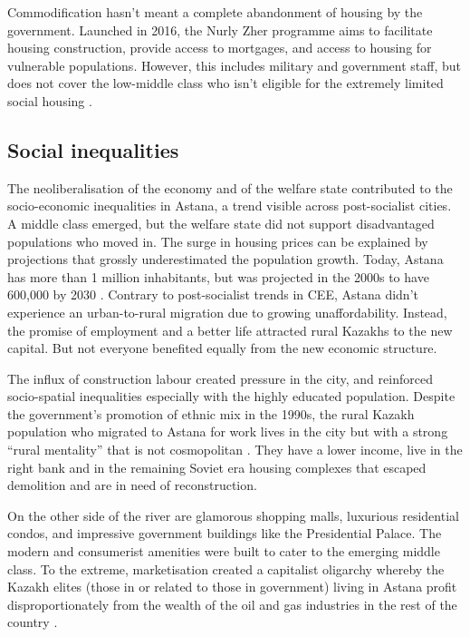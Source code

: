 \documentclass{article}
\begin{document}
Commodification hasn't meant a complete abandonment of housing by the government. Launched in 2016, the Nurly Zher programme aims to facilitate housing construction, provide access to mortgages, and access to housing for vulnerable populations. However, this includes military and government staff, but does not cover the low-middle class who isn't eligible for the extremely limited social housing \parencite{unece2018housing}.

\subsection{Social inequalities}

The neoliberalisation of the economy and of the welfare state contributed to the socio-economic inequalities in Astana, a trend visible across post-socialist cities. A middle class emerged, but the welfare state did not support disadvantaged populations who moved in. The surge in housing prices can be explained by projections that grossly underestimated the population growth. Today, Astana has more than 1 million inhabitants, but was projected in the 2000s to have 600,000 by 2030 \parencite{masterplan2001}. Contrary to post-socialist trends in CEE, Astana didn't experience an urban-to-rural migration due to growing unaffordability. Instead, the promise of employment and a better life attracted rural Kazakhs to the new capital. But not everyone benefited equally from the new economic structure.

The influx of construction labour created pressure in the city, and reinforced socio-spatial inequalities especially with the highly educated population.
Despite the government's promotion of ethnic mix in the 1990s, the rural Kazakh population who migrated to Astana for work lives in the city but with a strong ``rural mentality'' that is not cosmopolitan \parencite{koch2014bordering}. They have a lower income, live in the right bank and in the remaining Soviet era housing complexes that escaped demolition and are in need of reconstruction.

On the other side of the river are glamorous shopping malls, luxurious residential condos, and impressive government buildings like the Presidential Palace. The modern and consumerist amenities were built to cater to the emerging middle class. To the extreme, marketisation created a capitalist oligarchy whereby the Kazakh elites (those in or related to those in government) living in Astana profit disproportionately from the wealth of the oil and gas industries in the rest of the country \parencite{gallo2021three}.
\end{document}
